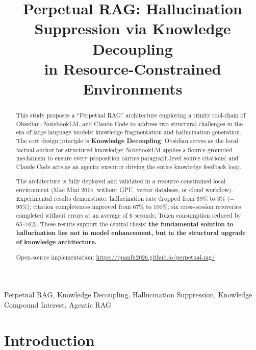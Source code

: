 \documentclass[conference]{IEEEtran}
\begin{document}
\title{Perpetual RAG: Hallucination Suppression via Knowledge Decoupling\\
in Resource-Constrained Environments}

\author{
}

\maketitle

\begin{abstract}
This study proposes a ``Perpetual RAG'' architecture employing a trinity
tool-chain of Obsidian, NotebookLM, and Claude Code to address two structural
challenges in the era of large language models: knowledge fragmentation and
hallucination generation. The core design principle is \textbf{Knowledge
Decoupling}: Obsidian serves as the local factual anchor for structured
knowledge; NotebookLM applies a Source-grounded mechanism to ensure every
proposition carries paragraph-level source citations; and Claude Code acts as
an agentic executor driving the entire knowledge feedback loop.

The architecture is fully deployed and validated in a resource-constrained
local environment (Mac Mini 2014, without GPU, vector database, or cloud
workflow). Experimental results demonstrate: hallucination rate dropped from
59\% to 3\% ($-$95\%); citation completeness improved from 67\% to 100\%;
six cross-session recoveries completed without errors at an average of 6
seconds; Token consumption reduced by 65--76\%. These results support the
central thesis: \textbf{the fundamental solution to hallucination lies not in
model enhancement, but in the structural upgrade of knowledge architecture.}

Open-source implementation: \url{https://quanfu2026.github.io/perpetual-rag/}
\end{abstract}

\begin{IEEEkeywords}
Perpetual RAG, Knowledge Decoupling, Hallucination Suppression,
Knowledge Compound Interest, Agentic RAG
\end{IEEEkeywords}

\section{Introduction}
\end{document}
